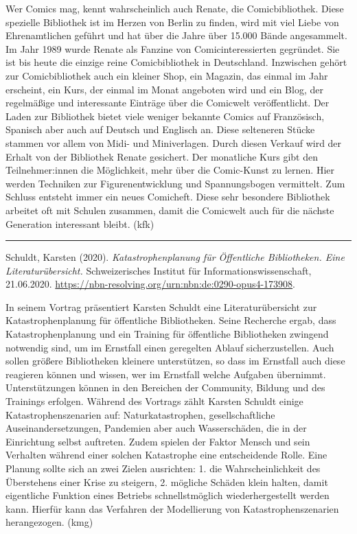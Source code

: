 \documentclass[a4paper,
fontsize=11pt,
oneside,
numbers=noperiodatend,
parskip=half-,
bibliography=totoc,
final
]{scrartcl}
\begin{document}
Wer Comics mag, kennt wahrscheinlich auch Renate, die Comicbibliothek.
Diese spezielle Bibliothek ist im Herzen von Berlin zu finden, wird mit
viel Liebe von Ehrenamtlichen geführt und hat über die Jahre über 15.000
Bände angesammelt. Im Jahr 1989 wurde Renate als Fanzine von
Comicinteressierten gegründet. Sie ist bis heute die einzige reine
Comicbibliothek in Deutschland. Inzwischen gehört zur Comicbibliothek
auch ein kleiner Shop, ein Magazin, das einmal im Jahr erscheint, ein
Kurs, der einmal im Monat angeboten wird und ein Blog, der regelmäßige
und interessante Einträge über die Comicwelt veröffentlicht. Der Laden
zur Bibliothek bietet viele weniger bekannte Comics auf Französisch,
Spanisch aber auch auf Deutsch und Englisch an. Diese selteneren Stücke
stammen vor allem von Midi- und Miniverlagen. Durch diesen Verkauf wird
der Erhalt von der Bibliothek Renate gesichert. Der monatliche Kurs gibt
den Teilnehmer:innen die Möglichkeit, mehr über die Comic-Kunst zu
lernen. Hier werden Techniken zur Figurenentwicklung und Spannungsbogen
vermittelt. Zum Schluss entsteht immer ein neues Comicheft. Diese sehr
besondere Bibliothek arbeitet oft mit Schulen zusammen, damit die
Comicwelt auch für die nächste Generation interessant bleibt. (kfk)

\begin{center}\rule{0.5\linewidth}{0.5pt}\end{center}

Schuldt, Karsten (2020). \emph{Katastrophenplanung für Öffentliche
Bibliotheken. Eine Literaturübersicht.} Schweizerisches Institut für
Informationswissenschaft, 21.06.2020.
\url{https://nbn-resolving.org/urn:nbn:de:0290-opus4-173908}.

In seinem Vortrag präsentiert Karsten Schuldt eine Literaturübersicht
zur Katastrophenplanung für öffentliche Bibliotheken. Seine Recherche
ergab, dass Katastrophenplanung und ein Training für öffentliche
Bibliotheken zwingend notwendig sind, um im Ernstfall einen geregelten
Ablauf sicherzustellen. Auch sollen größere Bibliotheken kleinere
unterstützen, so dass im Ernstfall auch diese reagieren können und
wissen, wer im Ernstfall welche Aufgaben übernimmt. Unterstützungen
können in den Bereichen der Community, Bildung und des Trainings
erfolgen. Während des Vortrags zählt Karsten Schuldt einige
Katastrophenszenarien auf: Naturkatastrophen, gesellschaftliche
Auseinandersetzungen, Pandemien aber auch Wasserschäden, die in der
Einrichtung selbst auftreten. Zudem spielen der Faktor Mensch und sein
Verhalten während einer solchen Katastrophe eine entscheidende Rolle.
Eine Planung sollte sich an zwei Zielen ausrichten: 1. die
Wahrscheinlichkeit des Überstehens einer Krise zu steigern, 2. mögliche
Schäden klein halten, damit eigentliche Funktion eines Betriebs
schnellstmöglich wiederhergestellt werden kann. Hierfür kann das
Verfahren der Modellierung von Katastrophenszenarien herangezogen. (kmg)
\end{document}
